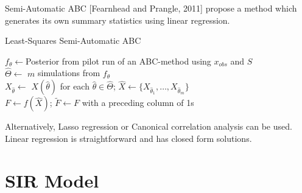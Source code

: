 \documentclass[aspectratio=169]{beamer}
\begin{document}
\begin{frame}{Semi-Automatic ABC}
  \footnotesize\setlength{\parskip}{.1\baselineskip}
  [Fearnhead and Prangle, 2011] propose a method which generates its own summary statistics using linear regression.
  \begin{block}{Least-Squares Semi-Automatic ABC}
    \begin{algorithm}[H]
      $f_\theta\leftarrow$Posterior from pilot run of an ABC-method using $x_{obs}$ and $S$\label{alg_semi_auto_abc_ls_pilot_run}\\
      $\hat\Theta\leftarrow$ $m$ simulations from $f_\theta$\label{alg_semi_auto_abc_ls_generate_1}\\
      $X_{\hat\theta}\leftarrow$ $X\left(\hat\theta\right)$ for each $\hat\theta\in\hat\Theta$\label{alg_semi_auto_abc_ls_generate_2};  $\hat{X}\leftarrow\{X_{\hat\theta_1},\dots,X_{\hat\theta_m}\}$\\
      $F\leftarrow f(\hat{X})$; $\tilde{F}\leftarrow F$ with a preceding column of 1s\\
    \end{algorithm}
  \end{block}
  Alternatively, Lasso regression or Canonical correlation analysis can be used. Linear regression is straightforward and has closed form solutions.
\end{frame}

\section{SIR Model}
\end{document}
